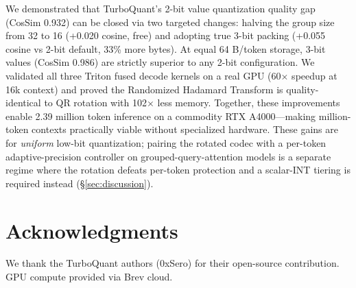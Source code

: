 \documentclass{article}
\begin{document}
We demonstrated that TurboQuant's 2-bit value quantization quality gap (CosSim 0.932) can be closed via two targeted changes: halving the group size from 32 to 16 (+0.020 cosine, free) and adopting true 3-bit packing (+0.055 cosine vs 2-bit default, 33\% more bytes). At equal 64 B/token storage, 3-bit values (CosSim 0.986) are strictly superior to any 2-bit configuration. We validated all three Triton fused decode kernels on a real GPU (60$\times$ speedup at 16k context) and proved the Randomized Hadamard Transform is quality-identical to QR rotation with 102$\times$ less memory. Together, these improvements enable 2.39 million token inference on a commodity RTX A4000—making million-token contexts practically viable without specialized hardware. These gains are for \emph{uniform} low-bit quantization; pairing the rotated codec with a per-token adaptive-precision controller on grouped-query-attention models is a separate regime where the rotation defeats per-token protection and a scalar-INT tiering is required instead (\S\ref{sec:discussion}).


\section*{Acknowledgments}
We thank the TurboQuant authors (0xSero) for their open-source contribution. GPU compute provided via Brev cloud.

\end{document}
